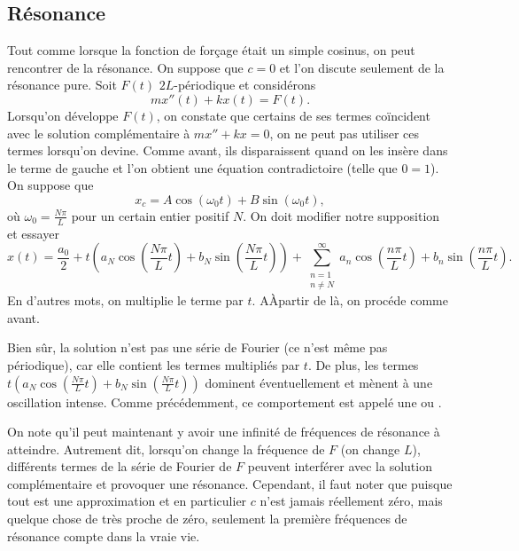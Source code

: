 \subsection{Résonance}

Tout comme lorsque la fonction de forçage était un simple cosinus, on peut rencontrer de la 
résonance. On suppose  que $ c = 0 $ et l'on discute seulement de la résonance pure.
Soit $ F (t) $ $ 2L $-périodique et considérons
\begin{equation*}
m x''(t) + k x (t) = F(t) .
\end{equation*}
Lorsqu'on développe $ F (t) $, on constate que certains de ses termes coïncident avec le
solution complémentaire à $ mx '' + kx = 0 $, on ne peut pas utiliser ces termes lorsqu'on
devine. Comme avant, ils disparaissent quand on les insère dans le terme de gauche et l'on obtient une équation contradictoire (telle que $ 0 = 1 $). On suppose que
\begin{equation*}
x_c = A \cos (\omega_0 t) + B \sin (\omega_0 t), 
\end{equation*}
où $\omega_0 = \frac{N \pi}{L}$ pour un certain entier positif $N$.
On doit modifier notre supposition et essayer  
\begin{equation*}
x(t) = \frac{a_0}{2} +
t \left(
a_N \cos \left( \frac{N \pi}{L} t \right) +
b_N \sin \left( \frac{N \pi}{L} t \right) \right) +
\sum_{\substack{n=1\\n\not= N}}^\infty
a_n \cos \left( \frac{n \pi}{L} t \right) +
b_n \sin \left( \frac{n \pi}{L} t \right) .
\end{equation*}
En d'autres mots, on multiplie le terme par $ t $. AÀpartir de là, on
procéde comme avant.

Bien sûr, la solution n'est pas une série de Fourier (ce n'est même pas
périodique), car elle contient les termes multipliés par $ t $. De plus, les
termes
$t \left( a_N \cos \left( \frac{N \pi}{L} t \right) +
b_N \sin \left( \frac{N \pi}{L} t \right) \right)$ dominent éventuellement et mènent à une oscillation intense. Comme précédemment, ce comportement est appelé une  \emph{} ou  \emph{}.

On note qu'il peut maintenant y avoir une infinité de fréquences de résonance à atteindre.
Autrement dit, lorsqu'on change la fréquence de $ F $ (on change $ L $),  différents termes de la série de Fourier de $ F $ peuvent interférer avec la solution complémentaire et provoquer une résonance.
Cependant, il faut noter que puisque tout est une approximation et en
particulier $ c $ n'est jamais réellement zéro, mais quelque chose de très proche de zéro,
seulement la première fréquences de résonance compte dans la vraie vie.

